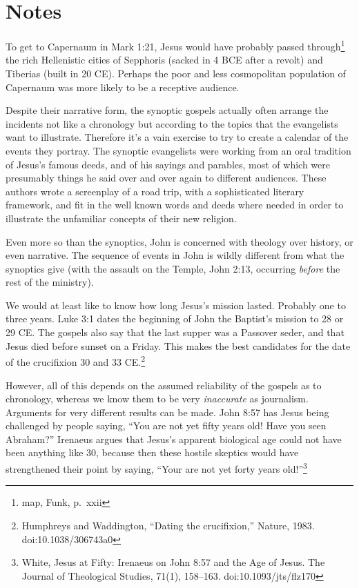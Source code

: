 \documentclass[10pt,a5paper,twoside]{article}
\newcommand{\quotesize}{\normalsize{}}
\newcommand{\maintextquotesize}{\renewcommand{\quotesize}{\large{}}}
\newcommand{\notequotesize}{\renewcommand{\quotesize}{\normalsize{}}}
\newcommand{\intex}[1]{\index[texts]{#1}}
\newcommand{\reftex}[1]{#1\intex{#1}}
\newenvironment{notesection}[1]{
  \setcounter{secnumdepth}{0}          %
  \section*{#1}
  \setcounter{secnumdepth}{2}          %
  \notequotesize
}%
{
  \maintextquotesize
}
\begin{document}
\begin{notesection}{Notes}
To get to Capernaum in \reftex{Mark 1:21}, Jesus would have probably passed through\footnote{map, Funk, p.~xxii} the rich Hellenistic cities of
Sepphoris (sacked in 4 BCE after a revolt) and Tiberias (built in 20 CE). Perhaps the poor and less cosmopolitan
population of Capernaum was more likely to be a receptive audience.

Despite their narrative form,
the synoptic gospels actually often arrange the incidents not like a chronology but according to the topics that the evangelists want to illustrate.
Therefore it's a vain exercise to try to create a calendar of the events they portray. The synoptic evangelists were working
from an oral tradition of Jesus's famous deeds, and of his sayings and parables, most of which were presumably things he said over and over
again to different audiences. These authors wrote a screenplay of a road trip, with a sophisticated literary framework,
and fit in the well known words and deeds where needed in order to illustrate the unfamiliar concepts of their new
religion.

Even more so than the synoptics, John is concerned with
theology over history, or even narrative. The sequence of events in
John is wildly different from what the synoptics give (with the
assault on the Temple, John 2:13, occurring \emph{before} the rest of
the ministry).

We would at least like to know how long Jesus's mission
lasted. Probably one to three years.  Luke 3:1 dates the beginning of
John the Baptist's mission to 28 or 29 CE.  The gospels also say that
the last supper was a Passover seder, and that Jesus died before
sunset on a Friday.  This makes the best candidates for the date of
the crucifixion 30 and 33 CE.\footnote{Humphreys and Waddington,
``Dating the crucifixion,'' Nature, 1983. doi:10.1038/306743a0 }

However, all of this depends on the assumed reliability of the
gospels as to chronology, whereas we know them to be very \emph{inaccurate} as journalism.
Arguments for very different results can be made.
John 8:57 has Jesus being challenged by people saying, ``You are not yet fifty years old! Have you seen Abraham?''
Irenaeus argues that Jesus's apparent biological age could not have been anything like 30, because then these
hostile skeptics would have strengthened their point by saying, ``Your are not yet forty 
years old!''\footnote{White, Jesus at Fifty: Irenaeus on John 8:57 and the Age of Jesus.
The Journal of Theological Studies, 71(1), 158–163. doi:10.1093/jts/flz170}


\end{notesection}
\end{document}
